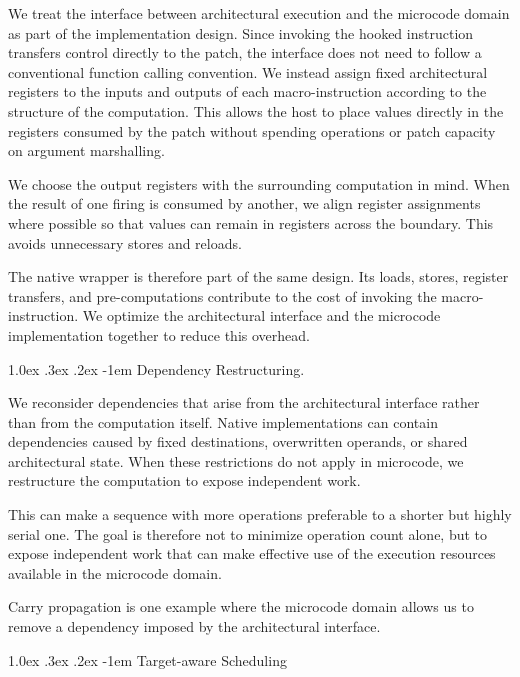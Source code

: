 \documentclass[journal=tches,submission]{iacrtrans}
\makeatletter
\renewcommand\paragraph{\@startsection{paragraph}{4}{\z@}%
      {1.0ex \@plus .3ex \@minus .2ex}%
      {-1em}%
      {\normalfont\normalsize\bfseries\SS@parafont}}
\makeatother
\begin{document}
We treat the interface between architectural execution and the microcode domain as part of the implementation design.
Since invoking the hooked instruction transfers control directly to the patch, the interface does not need to follow a conventional function calling convention.
We instead assign fixed architectural registers to the inputs and outputs of each macro-instruction according to the structure of the computation.
This allows the host to place values directly in the registers consumed by the patch without spending operations or patch capacity on argument marshalling.

We choose the output registers with the surrounding computation in mind.
When the result of one firing is consumed by another, we align register assignments where possible so that values can remain in registers across the boundary.
This avoids unnecessary stores and reloads.

The native wrapper is therefore part of the same design.
Its loads, stores, register transfers, and pre-computations contribute to the cost of invoking the macro-instruction.
We optimize the architectural interface and the microcode implementation together to reduce this overhead.

\paragraph{Dependency Restructuring.}
\label{sec:method-restructuring}

We reconsider dependencies that arise from the architectural interface rather than from the computation itself.
Native implementations can contain dependencies caused by fixed destinations, overwritten operands, or shared architectural state.
When these restrictions do not apply in microcode, we restructure the computation to expose independent work.

This can make a sequence with more operations preferable to a shorter but highly serial one.
The goal is therefore not to minimize operation count alone, but to expose independent work that can make effective use of the execution resources available in the microcode domain.

Carry propagation is one example where the microcode domain allows us to remove a dependency imposed by the architectural interface.

\paragraph{Target-aware Scheduling}
\label{sec:method-scheduling}
\end{document}
